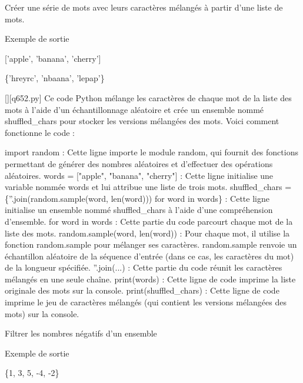         \question
        Créer une série de mots avec leurs caractères mélangés à partir d'une liste de mots.

Exemple de sortie

['apple', 'banana', 'cherry']

\{'hreyrc', 'nbaana', 'lepap'\}
        \par
        \begin{solution}
            \renewcommand{\nomfichier}{q652.py}
            \pythonfile{\chemincode \nomfichier}[][\nomfichier]
            Ce code Python mélange les caractères de chaque mot de la liste des mots à l'aide d'un échantillonnage aléatoire et crée un ensemble nommé shuffled\_chars pour stocker les versions mélangées des mots. Voici comment fonctionne le code :

    import random : Cette ligne importe le module random, qui fournit des fonctions permettant de générer des nombres aléatoires et d'effectuer des opérations aléatoires.
    words = ["apple", "banana", "cherry"] : Cette ligne initialise une variable nommée words et lui attribue une liste de trois mots.
    shuffled\_chars = \{''.join(random.sample(word, len(word))) for word in words\} : Cette ligne initialise un ensemble nommé shuffled\_chars à l'aide d'une compréhension d'ensemble.
        for word in words : Cette partie du code parcourt chaque mot de la liste des mots.
        random.sample(word, len(word)) : Pour chaque mot, il utilise la fonction random.sample pour mélanger ses caractères. random.sample renvoie un échantillon aléatoire de la séquence d'entrée (dans ce cas, les caractères du mot) de la longueur spécifiée.
        ''.join(...) : Cette partie du code réunit les caractères mélangés en une seule chaîne.
    print(words) : Cette ligne de code imprime la liste originale des mots sur la console.
    print(shuffled\_chars) : Cette ligne de code imprime le jeu de caractères mélangés (qui contient les versions mélangées des mots) sur la console.
        \end{solution}
        

        \question
        Filtrer les nombres négatifs d'un ensemble

Exemple de sortie

\{1, 3, 5, -4, -2\}

